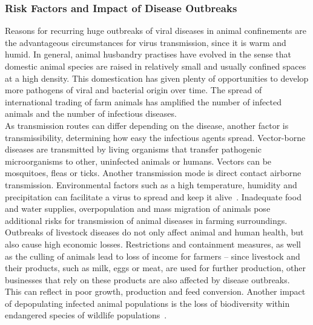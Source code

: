 \subsubsection*{Risk Factors and Impact of Disease Outbreaks}
Reasons for recurring huge outbreaks of viral diseases in animal confinements are the advantageous circumstances for virus transmission, since it is warm and humid. In general, animal husbandry practises have evolved in the sense that domestic animal species are raised in relatively small and usually confined spaces at a high density. This domestication has given plenty of opportunities to develop more pathogens of viral and bacterial origin over time. The spread of international trading of farm animals has amplified the number of infected animals and the number of infectious diseases. \\
As transmission routes can differ depending on the disease, another factor is transmissibility, determining how easy the infectious agents spread. Vector-borne diseases are transmitted by living organisms that transfer pathogenic microorganisms to other, uninfected animals or humans. Vectors can be mosquitoes, fleas or ticks. Another transmission mode is direct contact airborne transmission. Environmental factors such as a high temperature, humidity and precipitation can facilitate a virus to spread and keep it alive~\cite{eccles2002explanation}. Inadequate food and water supplies, overpopulation and mass migration of animals pose additional risks for transmission of animal diseases in farming surroundings. \\
Outbreaks of livestock diseases do not only affect animal and human health, but also cause high economic losses. Restrictions and containment measures, as well as the culling of animals lead to loss of income for farmers -- since livestock and their products, such as milk, eggs or meat, are used for further production, other businesses that rely on these products are also affected by disease outbreaks.\\
This can reflect in poor growth, production and feed conversion. Another impact of depopulating infected animal populations is the loss of biodiversity within endangered species of wildlife populations~\cite{lacroix2014non, morand2020emerging, reid2010global}.

